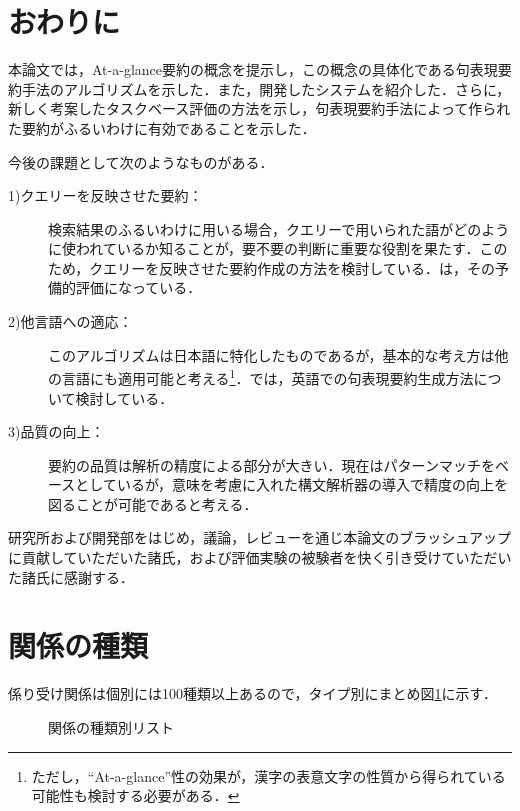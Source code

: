 \section{おわりに}

本論文では，At-a-glance要約の概念を提示し，この概念の具体化である句表現要約手法のアルゴリズムを示した．また，開発したシステムを紹介した．さらに，新しく考案したタスクベース評価の方法を示し，句表現要約手法によって作られた要約がふるいわけに有効であることを示した．

今後の課題として次のようなものがある．
\begin{description}
 \item[1)クエリーを反映させた要約：] 検索結果のふるいわけに用いる場合，クエリーで用いられた語がどのように使われているか知ることが，要不要の判断に重要な役割を果たす．このため，クエリーを反映させた要約作成の方法を検討している．\cite{oka01}は，その予備的評価になっている．
 \item[2)他言語への適応：] このアルゴリズムは日本語に特化したものであるが，基本的な考え方は他の言語にも適用可能と考える\footnote{ただし，``At-a-glance''性の効果が，漢字の表意文字の性質から得られている可能性も検討する必要がある．}．\cite{ueda00}では，英語での句表現要約生成方法について検討している．
 \item[3)品質の向上：] 要約の品質は解析の精度による部分が大きい．現在はパターンマッチをベースとしているが，意味を考慮に入れた構文解析器の導入で精度の向上を図ることが可能であると考える．
\end{description}

\acknowledgment

研究所および開発部をはじめ，議論，レビューを通じ本論文のブラッシュアップに貢献していただいた諸氏，および評価実験の被験者を快く引き受けていただいた諸氏に感謝する．





\appendix

\section{関係の種類} \label{app1}
係り受け関係は個別には100種類以上あるので，タイプ別にまとめ図\ref{kankei}に示す．

\begin{figure}[htbp]
\begin{center}
  \caption{関係の種類別リスト}
  \label{kankei}
\end{center}
\end{figure}


